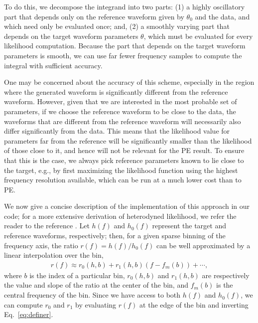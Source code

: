 \documentclass[twocolumn]{aastex631}
\begin{document}
To do this, we decompose the integrand into two parts: (1) a highly oscillatory
part that depends only on the reference waveform given by $\theta_0$ and
the data, and which need only be evaluated once; and, (2) a smoothly
varying part that depends on the target waveform parameters $\theta$, which
must be evaluated for every likelihood computation. Because the part
that depends on the target waveform parameters is smooth, we can use far fewer
frequency samples to compute the integral with sufficient accuracy.

One may be concerned about the accuracy of this scheme, especially in the
region where the generated waveform is significantly different from the
reference waveform. However, given that we are interested in the most probable
set of parameters, if we choose the reference waveform to be close to the data,
the waveforms that are different from the reference waveform will necessarily
also differ significantly from the data. This means that the likelihood value
for parameters far from the reference will be significantly smaller than the
likelihood of those close to it, and hence will not be relevant for the PE
result. To ensure that this is the case, we always pick reference parameters
known to lie close to the target, e.g., by first maximizing the likelihood
function using the highest frequency resolution available, which can be run at
a much lower cost than to PE. 

We now give a concise description of the implementation of this approach in our
code; for a more extensive derivation of heterodyned likelihood, we refer the
reader to the reference \cite{Zackay:2018qdy}. Let $h(f)$ and $h_0(f)$
represent the target and reference waveforms, respectively; then, for a given
sparse binning of the frequency axis, the ratio $r(f) = h(f)/h_0(f)$ can be
well approximated by a linear interpolation over the bin,
\begin{align}
r(f) \approx r_0(h,b) + r_1(h,b)(f- f_m(b)) + \cdots,
\label{eq:definer}
\end{align}
where $b$ is the index of a particular bin, $r_0(h,b)$ and $r_1(h,b)$ are
respectively the value and slope of the ratio at the center of the bin, and
$f_m(b)$ is the central frequency of the bin. Since we have access to both
$h(f)$ and $h_0(f)$, we can compute $r_0$ and $r_1$ by evaluating $r(f)$ at the
edge of the bin and inverting Eq.~\eqref{eq:definer}.
\end{document}
